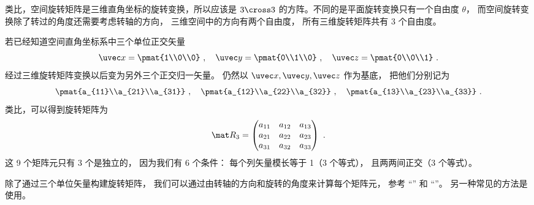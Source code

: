 
\begin{issues}
\issueDraft
\end{issues}


类比，空间旋转矩阵是三维直角坐标的旋转变换，所以应该是 $3 \cross 3$ 的方阵。不同的是平面旋转变换只有一个自由度 $\theta $， 而空间旋转变换除了转过的角度还需要考虑转轴的方向， 三维空间中的方向有两个自由度， 所有三维旋转矩阵共有 3 个自由度。

若已经知道空间直角坐标系中三个单位正交矢量
\begin{equation}
\uvec x=\pmat{1\\0\\0}~, \quad
\uvec y=\pmat{0\\1\\0}~, \quad
\uvec z=\pmat{0\\0\\1}~.
\end{equation}
经过三维旋转矩阵变换以后变为另外三个正交归一矢量。 仍然以 $\uvec x, \uvec y, \uvec z$ 作为基底， 把他们分别记为
\begin{equation}\label{eq_Rot3D_1}
\pmat{a_{11}\\a_{21}\\a_{31}} ~,\quad \pmat{a_{12}\\a_{22}\\a_{32}} ~,\quad \pmat{a_{13}\\a_{23}\\a_{33}}~.
\end{equation}
类比，可以得到旋转矩阵为
\begin{equation}
\mat R_3 = \begin{pmatrix}
{a_{11}}&{a_{12}}&{a_{13}}\\
{a_{21}}&{a_{22}}&{a_{23}}\\
{a_{31}}&{a_{32}}&{a_{33}}
\end{pmatrix}~.\end{equation}
这 9 个矩阵元只有 3 个是独立的， 因为我们有 6 个条件： 每个列矢量模长等于 1（3 个等式）， 且两两间正交（3 个等式）。

除了通过三个单位矢量构建旋转矩阵， 我们可以通过由转轴的方向和旋转的角度来计算每个矩阵元， 参考 “” 和 “”。 另一种常见的方法是使用。

